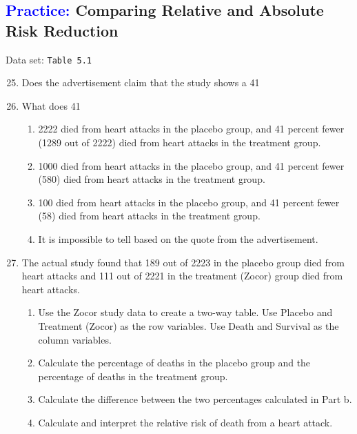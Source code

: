 \documentclass[
]{report}
\begin{document}
\hypertarget{comparing-relative-and-absolute-risk-reduction}{%
\subsection*{\texorpdfstring{\textcolor{blue}{Practice:} Comparing Relative and Absolute Risk Reduction}{ Comparing Relative and Absolute Risk Reduction}}\label{comparing-relative-and-absolute-risk-reduction}}

Data set: \texttt{Table\ 5.1}

\begin{enumerate}
  \setcounter{enumi}{24}

  \item Does the advertisement claim that the study shows a 41%

\item What does 41%

\begin{enumerate}
  \item 2222 died from heart attacks in the placebo group, and 41 percent fewer (1289 out of 2222) died from heart attacks in the treatment group.  
  \item 1000 died from heart attacks in the placebo group, and 41 percent fewer (580) died from heart attacks in the treatment group.  
  \item 100 died from heart attacks in the placebo group, and 41 percent fewer (58) died from heart attacks in the treatment group.  
  \item It is impossible to tell based on the quote from the advertisement. \end{enumerate} 

\item The actual study found that 189 out of 2223 in the placebo group died from heart attacks and 111 out of 2221 in the treatment (Zocor) group died from heart attacks.  
\begin{enumerate}
  \item Use the Zocor study data to create a two-way table. Use Placebo and Treatment (Zocor) as the row variables. Use Death and Survival as the column variables.  
  \item Calculate the percentage of deaths in the placebo group and the percentage of deaths in the treatment group.  
  \item Calculate the difference between the two percentages calculated in Part b.  
  \item Calculate and interpret the relative risk of death from a heart attack.
\end{enumerate}
\end{enumerate}
\end{document}
